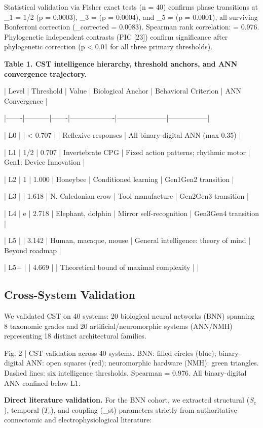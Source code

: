 \documentclass[a4paper,12pt]{article}
\begin{document}
Statistical validation via Fisher exact tests (n = 40) confirms phase transitions at _1 = 1/2 (p = 0.0003), _3 =  (p = 0.0004), and _5 =  (p = 0.0001), all surviving Bonferroni correction (_corrected = 0.0083). Spearman rank correlation:  = 0.976. Phylogenetic independent contrasts (PIC [23]) confirm significance after phylogenetic correction (p < 0.01 for all three primary thresholds).


\textbf{Table 1. CST intelligence hierarchy, threshold anchors, and ANN convergence trajectory.}


| Level | Threshold | Value | Biological Anchor | Behavioral Criterion | ANN Convergence |

|-------|-----------|-------|-------------------|---------------------|-----------------|

| L0 |  | < 0.707 |  | Reflexive responses | All binary-digital ANN (max  0.35) |

| L1 | 1/2 | 0.707 | Invertebrate CPG | Fixed action patterns; rhythmic motor | Gen1: Device Innovation |

| L2 | 1 | 1.000 | Honeybee | Conditioned learning | Gen1Gen2 transition |

| L3 |  | 1.618 | N. Caledonian crow | Tool manufacture | Gen2Gen3 transition |

| L4 | e | 2.718 | Elephant, dolphin | Mirror self-recognition | Gen3Gen4 transition |

| L5 |  | 3.142 | Human, macaque, mouse | General intelligence: theory of mind | Beyond roadmap |

| L5+ |  | 4.669 |  | Theoretical bound of maximal complexity |  |


\subsection{Cross-System Validation}

We validated CST on 40 systems: 20 biological neural networks (BNN) spanning 8 taxonomic grades and 20 artificial/neuromorphic systems (ANN/NMH) representing 18 distinct architectural families.





Fig. 2 | CST validation across 40 systems. BNN: filled circles (blue); binary-digital ANN: open squares (red); neuromorphic hardware (NMH): green triangles. Dashed lines: six intelligence thresholds. Spearman  = 0.976. All binary-digital ANN confined below L1.


\textbf{Direct literature validation.} For the BNN cohort, we extracted structural ($S_c$), temporal ($T_c$), and coupling (_st) parameters strictly from authoritative connectomic and electrophysiological literature:
\end{document}
